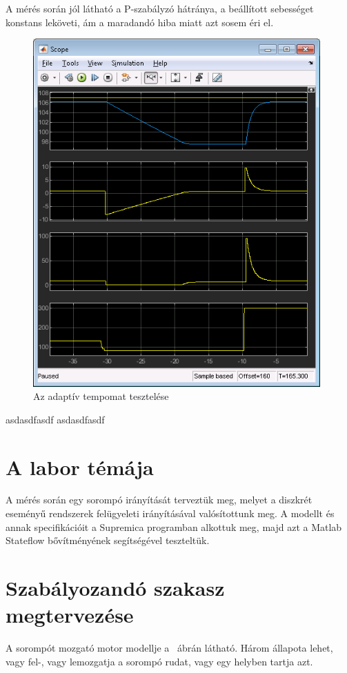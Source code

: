 A mérés során jól látható a P-szabályzó hátránya, a beállított sebességet konstans leköveti, ám a maradandó hiba miatt azt sosem éri el.

\begin{figure}[!ht]
	\centering
	\includegraphics[width=110mm,keepaspectratio]{figures/2m04/f2_scope_3.png}
	\caption{Az adaptív tempomat tesztelése}
	\label{fig:scope2}
\end{figure}




\newpage
asdasdfasdf
\newpage
asdasdfasdf
\newpage
\section{A labor témája}
A mérés során egy sorompó irányítását terveztük meg, melyet a diszkrét eseményű rendszerek felügyeleti irányításával valósítottunk meg. A modellt és annak specifikációit a Supremica programban alkottuk meg, majd azt a Matlab Stateflow bővítményének segítségével teszteltük.


\section{Szabályozandó szakasz megtervezése}
A sorompót mozgató motor modellje a ~ábrán látható. Három állapota lehet, vagy fel-, vagy lemozgatja a sorompó rudat, vagy egy helyben tartja azt. 

